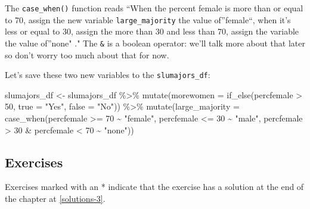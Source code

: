 \documentclass[
]{book}
\newenvironment{Shaded}{\begin{snugshade}}{\end{snugshade}}
\newcommand{\AttributeTok}[1]{\textcolor[rgb]{0.77,0.63,0.00}{#1}}
\newcommand{\DecValTok}[1]{\textcolor[rgb]{0.00,0.00,0.81}{#1}}
\newcommand{\FunctionTok}[1]{\textcolor[rgb]{0.00,0.00,0.00}{#1}}
\newcommand{\NormalTok}[1]{#1}
\newcommand{\OtherTok}[1]{\textcolor[rgb]{0.56,0.35,0.01}{#1}}
\newcommand{\SpecialCharTok}[1]{\textcolor[rgb]{0.00,0.00,0.00}{#1}}
\newcommand{\StringTok}[1]{\textcolor[rgb]{0.31,0.60,0.02}{#1}}
\begin{document}
The \texttt{case\_when()} function reads ``When the percent female is more than or equal to 70, assign the new variable \texttt{large\_majority} the value of''female``, when it's less or equal to 30, assign the more than 30 and less than 70, assign the variable the value of''none" ." The \texttt{\&} is a boolean operator: we'll talk more about that later so don't worry too much about that for now.

Let's save these two new variables to the \texttt{slumajors\_df}:

\begin{Shaded}
\begin{Highlighting}[]
\NormalTok{slumajors\_df }\OtherTok{\textless{}{-}}\NormalTok{ slumajors\_df }\SpecialCharTok{\%\textgreater{}\%}
  \FunctionTok{mutate}\NormalTok{(}\AttributeTok{morewomen =} \FunctionTok{if\_else}\NormalTok{(percfemale }\SpecialCharTok{\textgreater{}} \DecValTok{50}\NormalTok{,}
                             \AttributeTok{true =} \StringTok{"Yes"}\NormalTok{,}
                             \AttributeTok{false =} \StringTok{"No"}\NormalTok{)) }\SpecialCharTok{\%\textgreater{}\%}
  \FunctionTok{mutate}\NormalTok{(}\AttributeTok{large\_majority =}
           \FunctionTok{case\_when}\NormalTok{(percfemale }\SpecialCharTok{\textgreater{}=} \DecValTok{70} \SpecialCharTok{\textasciitilde{}} \StringTok{"female"}\NormalTok{,}
\NormalTok{                     percfemale }\SpecialCharTok{\textless{}=} \DecValTok{30} \SpecialCharTok{\textasciitilde{}} \StringTok{"male"}\NormalTok{,}
\NormalTok{                     percfemale }\SpecialCharTok{\textgreater{}} \DecValTok{30} \SpecialCharTok{\&}\NormalTok{ percfemale }\SpecialCharTok{\textless{}} \DecValTok{70} \SpecialCharTok{\textasciitilde{}} \StringTok{"none"}\NormalTok{)) }
\end{Highlighting}
\end{Shaded}

\hypertarget{exercise-3-1}{%
\subsection{Exercises}\label{exercise-3-1}}

Exercises marked with an * indicate that the exercise has a solution at the end of the chapter at \ref{solutions-3}.
\end{document}
